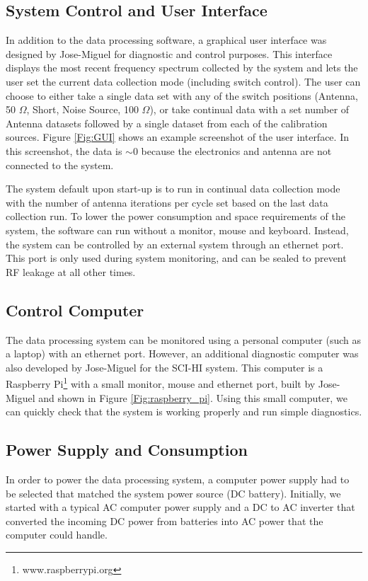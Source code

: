 \subsection{System Control and User Interface}
In addition to the data processing software, a graphical user interface was designed by Jose-Miguel for diagnostic and control purposes. This interface displays the most recent frequency spectrum collected by the system and lets the user set the current data collection mode (including switch control). The user can choose to either take a single data set with any of the switch positions (Antenna, 50 $\Omega$, Short, Noise Source, 100 $\Omega$), or take continual data with a set number of Antenna datasets followed by a single dataset from each of the calibration sources. Figure \ref{Fig:GUI} shows an example screenshot of the user interface. In this screenshot, the data is $\sim0$ because the electronics and antenna are not connected to the system. 

The system default upon start-up is to run in continual data collection mode with the number of antenna iterations per cycle set based on the last data collection run. To lower the power consumption and space requirements of the system, the software can run without a monitor, mouse and keyboard. Instead, the system can be controlled by an external system through an ethernet port. This port is only used during system monitoring, and can be sealed to prevent RF leakage at all other times. 

\subsection{Control Computer}
The data processing system can be monitored using a personal computer (such as a laptop) with an ethernet port. However, an additional diagnostic computer was also developed by Jose-Miguel for the SCI-HI system. This computer is a Raspberry Pi\footnote{www.raspberrypi.org} with a small monitor, mouse and ethernet port, built by Jose-Miguel and shown in Figure \ref{Fig:raspberry_pi}. Using this small computer, we can quickly check that the system is working properly and run simple diagnostics.

\subsection{Power Supply and Consumption}
In order to power the data processing system, a computer power supply had to be selected that matched the system power source (DC battery). Initially, we started with a typical AC computer power supply and a DC to AC inverter that converted the incoming DC power from batteries into AC power that the computer could handle. 


